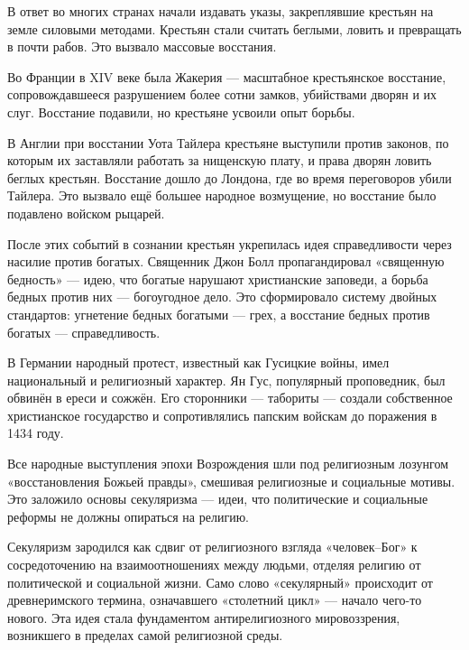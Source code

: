 В ответ во многих странах начали издавать указы, закреплявшие крестьян на земле силовыми методами. Крестьян стали считать беглыми, ловить и превращать в почти рабов. Это вызвало массовые восстания.

Во Франции в XIV веке была Жакерия --- масштабное крестьянское восстание, сопровождавшееся разрушением более сотни замков, убийствами дворян и их слуг. Восстание подавили, но крестьяне усвоили опыт борьбы.

В Англии при восстании Уота Тайлера крестьяне выступили против законов, по которым их заставляли работать за нищенскую плату, и права дворян ловить беглых крестьян. Восстание дошло до Лондона, где во время переговоров убили Тайлера. Это вызвало ещё большее народное возмущение, но восстание было подавлено войском рыцарей.

После этих событий в сознании крестьян укрепилась идея справедливости через насилие против богатых. Священник Джон Болл пропагандировал «священную бедность» --- идею, что богатые нарушают христианские заповеди, а борьба бедных против них --- богоугодное дело. Это сформировало систему двойных стандартов: угнетение бедных богатыми --- грех, а восстание бедных против богатых --- справедливость.

В Германии народный протест, известный как Гусицкие войны, имел национальный и религиозный характер. Ян Гус, популярный проповедник, был обвинён в ереси и сожжён. Его сторонники --- табориты --- создали собственное христианское государство и сопротивлялись папским войскам до поражения в 1434 году.

Все народные выступления эпохи Возрождения шли под религиозным лозунгом «восстановления Божьей правды», смешивая религиозные и социальные мотивы. Это заложило основы секуляризма --- идеи, что политические и социальные реформы не должны опираться на религию.

Секуляризм зародился как сдвиг от религиозного взгляда «человек–Бог» к сосредоточению на взаимоотношениях между людьми, отделяя религию от политической и социальной жизни. Само слово «секулярный» происходит от древнеримского термина, означавшего «столетний цикл» --- начало чего-то нового. Эта идея стала фундаментом антирелигиозного мировоззрения, возникшего в пределах самой религиозной среды.

